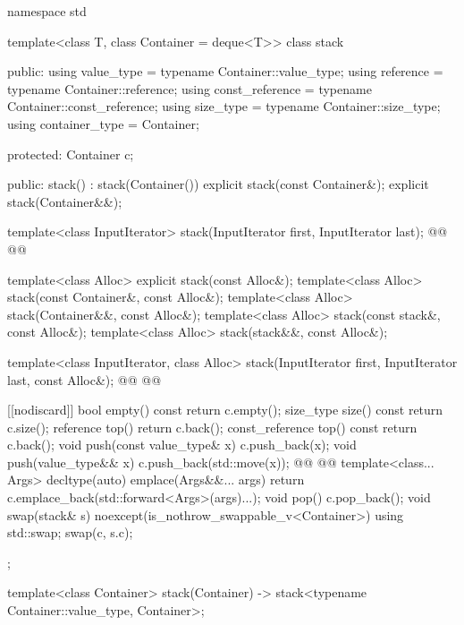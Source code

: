 \documentclass{wg21}
\begin{document}
\begin{codeblock}
namespace std {
    template<class T, class Container = deque<T>>
    class stack {
        public:
        using value_type      = typename Container::value_type;
        using reference       = typename Container::reference;
        using const_reference = typename Container::const_reference;
        using size_type       = typename Container::size_type;
        using container_type  = Container;

        protected:
        Container c;

        public:
        stack() : stack(Container()) {}
        explicit stack(const Container&);
        explicit stack(Container&&);

        template<class InputIterator>
        stack(InputIterator first, InputIterator last);
        @@
        @@

        template<class Alloc> explicit stack(const Alloc&);
        template<class Alloc> stack(const Container&, const Alloc&);
        template<class Alloc> stack(Container&&, const Alloc&);
        template<class Alloc> stack(const stack&, const Alloc&);
        template<class Alloc> stack(stack&&, const Alloc&);


        template<class InputIterator, class Alloc>
        stack(InputIterator first, InputIterator last, const Alloc&);
        @@
        @@

        [[nodiscard]] bool empty() const    { return c.empty(); }
        size_type size()  const             { return c.size(); }
        reference         top()             { return c.back(); }
        const_reference   top() const       { return c.back(); }
        void push(const value_type& x)      { c.push_back(x); }
        void push(value_type&& x)           { c.push_back(std::move(x)); }
        @@
        @@
        template<class... Args>
        decltype(auto) emplace(Args&&... args)
        { return c.emplace_back(std::forward<Args>(args)...); }
        void pop()                          { c.pop_back(); }
        void swap(stack& s) noexcept(is_nothrow_swappable_v<Container>)
        { using std::swap; swap(c, s.c); }
    };

    template<class Container>
    stack(Container) -> stack<typename Container::value_type, Container>;

}
\end{codeblock}
\end{document}
